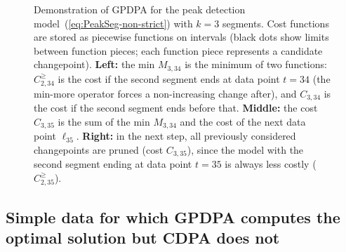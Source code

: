 \documentclass[aoas]{imsart}
\begin{document}
\begin{figure}[t!]
  \centering
  
\vskip -1cm
  \caption{
    Demonstration of GPDPA for the peak detection model~(\ref{eq:PeakSeg-non-strict})
    with $k=3$ segments. Cost functions are stored as piecewise
    functions on intervals (black dots show limits between function
    pieces; each function piece represents a candidate changepoint). 
    \textbf{Left:} the min \textcolor{Min}{$M_{3,34}$} is the
    minimum of two functions: \textcolor{MinMore}{$C^{\geq}_{2,34}$}
    is the cost if the second segment ends at data point $t=34$ (the
    min-more operator forces a non-increasing change after), and
    \textcolor{Ckt}{$C_{3,34}$} is the cost if the second segment ends
    before that. \textbf{Middle:} the cost \textcolor{Ckt}{$C_{3,35}$}
    is the sum of the min \textcolor{Min}{$M_{3,34}$} and the cost of
    the next data point \textcolor{Data}{$\ell_{35}$}. \textbf{Right:}
    in the next step, all previously considered changepoints are
    pruned (cost \textcolor{Ckt}{$C_{3,35}$}), since the model with the second
    segment ending at data point $t=35$ is always less costly
    (\textcolor{MinMore}{$C^{\geq}_{2,35}$}).  }
  \label{fig:min-envelope}
\end{figure}

\subsection{Simple data for which GPDPA computes the optimal solution
  but CDPA does not}
\end{document}
